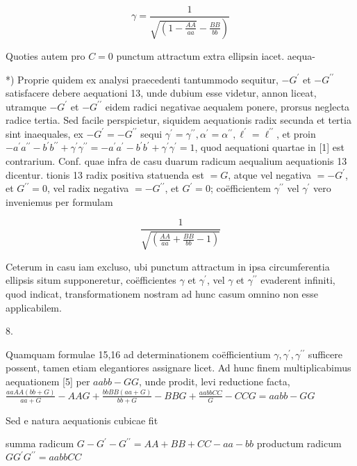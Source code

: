 \documentclass[10pt]{article}
\begin{document}
\[
\gamma=\frac{1}{\left.\sqrt{\left(1-\frac{A A}{a a}\right.}-\frac{B B}{b b}\right)}
\]

Quoties autem pro \(C=0\) punctum attractum extra ellipsin iacet. aequa-

*) Proprie quidem ex analysi praecedenti tantummodo sequitur, \(-G^{\prime}\) et \(-G^{\prime \prime}\) satisfacere debere aequationi 13, unde dubium esse videtur, annon liceat, utramque \(-G^{\prime}\) et \(-G^{\prime \prime}\) eidem radici negativae aequalem ponere, prorsus neglecta radice tertia. Sed facile perspicietur, siquidem aequationis radix secunda et tertia sint inaequales, ex \(-G^{\prime}=-G^{\prime \prime}\) sequi \(\gamma^{\prime}=\gamma^{\prime \prime}, \alpha^{\prime}=\alpha^{\prime \prime}, \ell^{\prime}=\ell^{\prime \prime}\), et proin \(-a^{\prime} a^{\prime \prime}-b^{\prime} b^{\prime \prime}+\gamma^{\prime} \gamma^{\prime \prime}=-a^{\prime} a^{\prime}-b^{\prime} b^{\prime}+\gamma^{\prime} \gamma^{\prime}=1\), quod aequationi quartae in [1] est contrarium. Conf. quae infra de casu duarum radicum aequalium aequationis 13 dicentur.
tionis 13 radix positiva statuenda est \(=G\), atque vel negativa \(=-G^{\prime}\), et \(G^{\prime \prime}=0\), vel radix negativa \(=-G^{\prime \prime}\), et \(G^{\prime}=0\); coëfficientem \(\gamma^{\prime \prime}\) vel \(\gamma^{\prime}\) vero inveniemus per formulam

\[
\frac{1}{\sqrt{\left(\frac{A A}{a a}+\frac{B B}{b b}-1\right)}}
\]

Ceterum in casu iam excluso, ubi punctum attractum in ipsa circumferentia ellipsis situm supponeretur, coëfficientes \(\gamma\) et \(\gamma^{\prime}\), vel \(\gamma\) et \(\gamma^{\prime \prime}\) evaderent infiniti, quod indicat, transformationem nostram ad hunc casum omnino non esse applicabilem.

8.

Quamquam formulae 15,16 ad determinationem coëfficientium \(\gamma, \gamma^{\prime}, \gamma^{\prime \prime}\) sufficere possent, tamen etiam elegantiores assignare licet. Ad hunc finem multiplicabimus aequationem [5] per \(a a b b-G G\), unde prodit, levi reductione facta, \(\frac{a a A A(b b+G)}{a a+G}-A A G+\frac{b b B B(a a+G)}{b b+G}-B B G+\frac{a a b b C C}{G}-C C G=a a b b-G G\)

Sed e natura aequationis cubicae fit

summa radicum \(G-G^{\prime}-G^{\prime \prime}=A A+B B+C C-a a-b b\) productum radicum \(G G^{\prime} G^{\prime \prime}=a a b b C C\)
\end{document}
